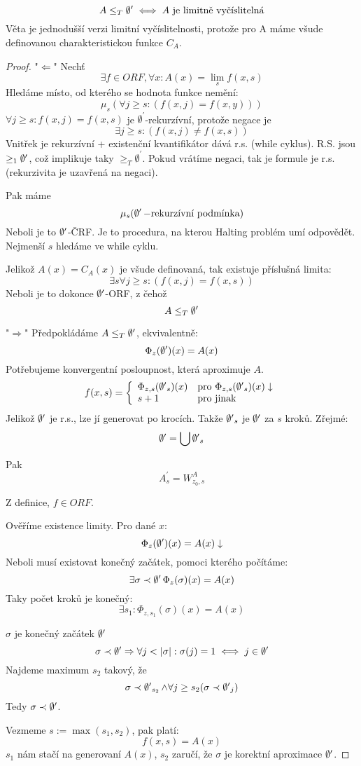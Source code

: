 \begin{theorem}\label{lim_comp}
	\[ A \leq_T \operatorname{\emptyset^{\prime}} \iff A\ \text{je limitně vyčíslitelná} \]
	Věta je jednodušší verzi limitní vyčíslitelnosti, protože pro A máme všude definovanou charakteristickou funkce $C_A$.
\end{theorem}
\begin{proof}
	"$\Leftarrow$" Nechť
	\[ \exists f \in ORF, \forall x: A(x) = \lim_s f(x, s) \]
	Hledáme místo, od kterého se hodnota funkce nemění:
	\[ \mu_s(\forall j \geq s:(f(x, j) = f(x, y))) \]
	$\forall j \geq s: f(x, j) = f(x, s)$ je $\emptyset^{\prime}$-rekurzívní, protože negace je
	\[ \exists j \geq s:(f(x, j) \neq f(x, s)) \]
	Vnitřek je rekurzívní + existenční kvantifikátor dává r.s. (while cyklus).
	R.S. jsou $\geq_1 \operatorname{\emptyset^{\prime}}$, což implikuje taky $\geq_T \emptyset^{\prime}$.
	Pokud vrátíme negaci, tak je formule je r.s. (rekurzivita je uzavřená na negaci).

	Pak máme
	\[ \mu_s(\operatorname{\emptyset^{\prime}}-\text{rekurzívní podmínka}) \]
	Neboli je to $\operatorname{\emptyset^{\prime}}$-ČRF.
	Je to procedura, na kterou Halting problém umí odpovědět.
	Nejmenší $s$ hledáme ve while cyklu.

	Jelikož $A(x) = C_A(x)$ je všude definovaná, tak existuje příslušná limita:
	\[ \exists s \forall j \geq s:(f(x, j) = f(x, s)) \]
	Neboli je to dokonce $\operatorname{\emptyset^{\prime}}$-ORF, z čehož
	\[ A \leq_T \operatorname{\emptyset^{\prime}} \]

	"$\Rightarrow$" Předpokládáme $A \leq_T \operatorname{\emptyset^{\prime}}$, ekvivalentně:
	\[ \Phi_z(\operatorname{\emptyset^{\prime}})(x) = A(x) \]
	Potřebujeme konvergentní posloupnost, která aproximuje $A$.
	\[ f(x, s) = \left\{ \begin{array}{ll} \Phi_{z, s}(\operatorname{\emptyset^{\prime}}_s)(x) & \mbox{pro } \Phi_{z, s}(\operatorname{\emptyset^{\prime}}_s)(x) \downarrow \\ s + 1 & \mbox{pro } \text{jinak} \end{array} \right. \]
	Jelikož $\operatorname{\emptyset^{\prime}}$ je r.s., lze jí generovat po krocích.
	Takže $\operatorname{\emptyset^{\prime}}_s$ je $\operatorname{\emptyset^{\prime}}$ za $s$ kroků.
	Zřejmé:
	\[ \operatorname{\emptyset^{\prime}} = \bigcup \operatorname{\emptyset^{\prime}}_s \]

	Pak
	\[ A_s^{\prime} = W_{z_0, s}^A \]

	Z definice, $f \in ORF$.

	Ověříme existence limity.
	Pro dané $x$:
	\[ \Phi_{z}(\operatorname{\emptyset^{\prime}})(x) = A(x) \downarrow \]
	Neboli musí existovat konečný začátek, pomoci kterého počítáme:
	\[ \exists \sigma \prec \operatorname{\emptyset^{\prime}} \Phi_{z}(\sigma)(x) = A(x)\]
	Taky počet kroků je konečný:
	\[ \exists s_1: \Phi_{z, s_1}(\sigma)(x) = A(x) \]

	$\sigma$ je konečný začátek $\operatorname{\emptyset^{\prime}}$
	\[ \sigma \prec \operatorname{\emptyset^{\prime}} \Rightarrow \forall j < |\sigma|: \sigma(j) = 1 \iff j \in \operatorname{\emptyset^{\prime}} \]
	Najdeme maximum $s_2$ takový, že
	\[ \sigma \prec \operatorname{\emptyset^{\prime}}_{s_2} \land \forall j \geq s_2 (\sigma \prec \operatorname{\emptyset^{\prime}}_j) \]
	Tedy $\sigma \prec \operatorname{\emptyset^{\prime}}$.

	Vezmeme $s:= \max(s_1, s_2)$, pak platí:
	\[ f(x, s) = A(x) \]
	$s_1$ nám stačí na generovaní $A(x)$, $s_2$ zaručí, že $\sigma$ je korektní aproximace $\operatorname{\emptyset^{\prime}}$.
\end{proof}

